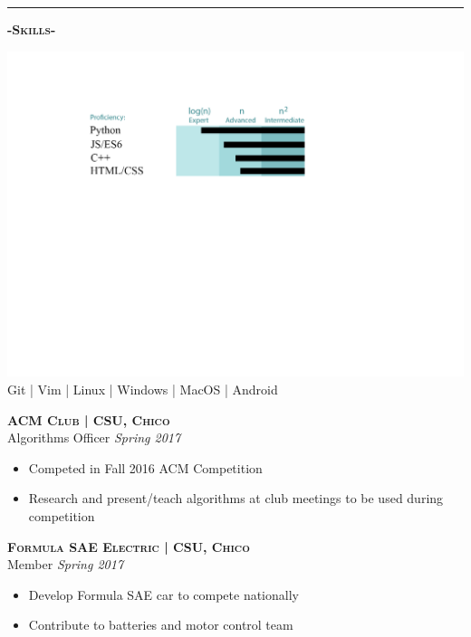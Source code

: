\documentclass[12pt]{article}
\begin{document}
\noindent\rule{19cm}{0.4pt}
\bigskip
\begin{multicols}{2}
\begin{center}
\textbf{\textsc{-Skills-}}
\bigskip

\includegraphics[trim={2.8cm 7cm 2cm 2cm},clip]{ResumePic.png}
\footnotesize
\color{gray}Git | Vim | Linux | Windows | MacOS | Android
\end{center}
\columnbreak
\center
\footnotesize
\color{black}\textsc{\textbf{ACM Club | CSU, Chico}}\\

\color{Cerulean}Algorithms Officer \hfill \color{gray}\textit{Spring 2017}\\
\begin{itemize}
\setlength{\itemsep}{0pt}
	\item Competed in Fall 2016 ACM Competition
	\item Research and present/teach algorithms at club meetings to be used during competition
\end{itemize}

\center
\color{black}\textsc{\textbf{Formula SAE Electric | CSU, Chico}}\\
\color{Cerulean}Member \hfill \color{gray}\textit{Spring 2017}

\begin{itemize}
\setlength{\itemsep}{0pt}
	\item Develop Formula SAE car to compete nationally
	\item Contribute to batteries and motor control team
\end{itemize}


\end{multicols}
\end{document}
